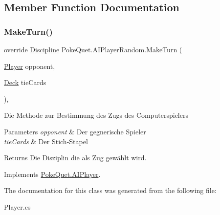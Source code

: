 \subsection{Member Function Documentation}
\mbox{\label{class_poke_quet_1_1_a_i_player_random_a8723ee791e3ac1ea34033cd6ce49398f}} 
\subsubsection{\texorpdfstring{Make\+Turn()}{MakeTurn()}}
{\footnotesize\ttfamily override \mbox{\hyperlink{namespace_poke_quet_aa425f1b8cf90847021fe1177d6a7199d}{Discipline}} Poke\+Quet.\+A\+I\+Player\+Random.\+Make\+Turn (\begin{DoxyParamCaption}\item[{\mbox{\hyperlink{class_poke_quet_1_1_player}{Player}}}]{opponent,  }\item[{\mbox{\hyperlink{class_poke_quet_1_1_deck}{Deck}}}]{tie\+Cards }\end{DoxyParamCaption})\hspace{0.3cm}{\ttfamily [inline]}, {\ttfamily [virtual]}}



Die Methode zur Bestimmung des Zugs des Computerspielers 


\begin{DoxyParams}{Parameters}
{\em opponent} & Der gegnerische Spieler\\
\hline
{\em tie\+Cards} & Der Stich-\/\+Stapel\\
\hline
\end{DoxyParams}
\begin{DoxyReturn}{Returns}
Die Disziplin die als Zug gewählt wird.
\end{DoxyReturn}


Implements \mbox{\hyperlink{class_poke_quet_1_1_a_i_player_ae2862ead657c524614793ea4d3ebf80b}{Poke\+Quet.\+A\+I\+Player}}.



The documentation for this class was generated from the following file\+:\begin{DoxyCompactItemize}
\item 
Player.\+cs\end{DoxyCompactItemize}

